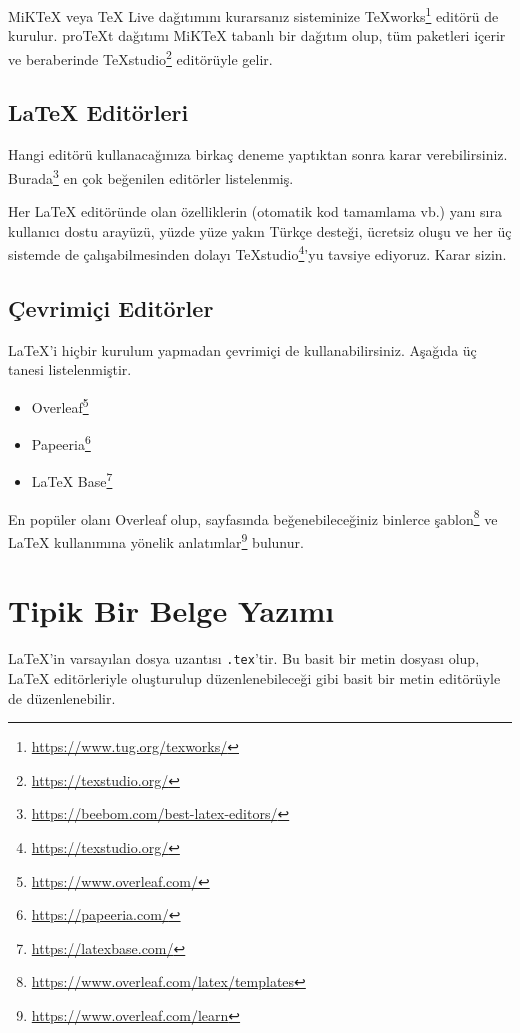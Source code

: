 \documentclass[
  10pt,
]{scrbook}
\providecommand{\tightlist}{%
  \setlength{\itemsep}{0pt}\setlength{\parskip}{0pt}}
\renewcommand{\href}[2]{#2\footnote{\url{#1}}}
\theoremstyle{definition}
\theoremstyle{definition}
\theoremstyle{definition}
\theoremstyle{definition}
\theoremstyle{remark}
\begin{document}
MiKTeX veya TeX Live dağıtımını kurarsanız sisteminize
\href{https://www.tug.org/texworks/}{TeXworks} editörü de kurulur. proTeXt dağıtımı MiKTeX tabanlı bir
dağıtım olup, tüm paketleri içerir ve beraberinde
\href{https://texstudio.org/}{TeXstudio} editörüyle gelir.

\hypertarget{latex-edituxf6rleri}{%
\subsection{LaTeX Editörleri}\label{latex-edituxf6rleri}}

Hangi editörü kullanacağınıza birkaç deneme yaptıktan sonra karar
verebilirsiniz. \href{https://beebom.com/best-latex-editors/}{Burada} en çok
beğenilen editörler listelenmiş.

Her LaTeX editöründe olan özelliklerin (otomatik kod tamamlama vb.) yanı
sıra kullanıcı dostu arayüzü, yüzde yüze yakın Türkçe desteği, ücretsiz
oluşu ve her üç sistemde de çalışabilmesinden dolayı
\href{https://texstudio.org/}{TeXstudio}'yu tavsiye ediyoruz. Karar sizin.

\hypertarget{uxe7evrimiuxe7i-edituxf6rler}{%
\subsection{Çevrimiçi Editörler}\label{uxe7evrimiuxe7i-edituxf6rler}}

LaTeX'i hiçbir kurulum yapmadan çevrimiçi de kullanabilirsiniz. Aşağıda
üç tanesi listelenmiştir.

\begin{itemize}
\tightlist
\item
  \href{https://www.overleaf.com/}{Overleaf}
\item
  \href{https://papeeria.com/}{Papeeria}
\item
  \href{https://latexbase.com/}{LaTeX Base}
\end{itemize}

En popüler olanı Overleaf olup, sayfasında beğenebileceğiniz binlerce
\href{https://www.overleaf.com/latex/templates}{şablon} ve LaTeX kullanımına yönelik
\href{https://www.overleaf.com/learn}{anlatımlar} bulunur.

\hypertarget{tipik}{%
\section{Tipik Bir Belge Yazımı}\label{tipik}}

LaTeX'in varsayılan dosya uzantısı \texttt{.tex}'tir. Bu basit bir metin
dosyası olup, LaTeX editörleriyle oluşturulup düzenlenebileceği gibi
basit bir metin editörüyle de düzenlenebilir.
\end{document}
